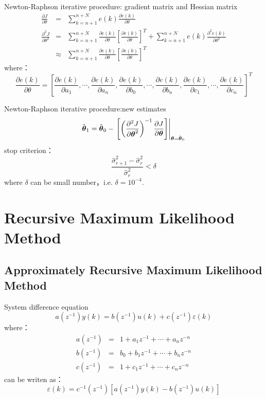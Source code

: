 \bgroup
{}
\begin{frame}{Newton-Raphson iterative procedure: gradient matrix and Hessian matrix }
\begin{eqnarray*}
\frac{\partial J}{\partial\theta} &=& \sum_{k=n+1}^{n+N}e(k)\frac{\partial e(k)}{\partial\theta}  \\
\frac{\partial^2 J}{\partial\theta^2} &=& \sum_{k=n+1}^{n+N}\frac{\partial e(k)}{\partial\theta}\left[\frac{\partial e(k)}{\partial\theta}\right]^T+\sum_{k=n+1}^{n+N}e(k)\frac{\partial^2 e(k)}{\partial\theta^2}  \\
 &\approx& \sum_{k=n+1}^{n+N}\frac{\partial e(k)}{\partial\theta}\left[\frac{\partial e(k)}{\partial\theta}\right]^T
\end{eqnarray*}
where：
$$
\frac{\partial e(k)}{\partial\theta}=\left[\frac{\partial e(k)}{\partial a_1},\cdots,\frac{\partial e(k)}{\partial a_n},\frac{\partial e(k)}{\partial b_0},\cdots,\frac{\partial e(k)}{\partial b_n},\frac{\partial e(k)}{\partial c_1},\cdots,\frac{\partial e(k)}{\partial c_n}\right]^T
$$
\end{frame}
\egroup

\begin{frame}{Newton-Raphson iterative procedure:new estimates}
$$
\hat{\boldsymbol{\theta}}_1 = \hat{\boldsymbol{\theta}}_0 - \left.\left[ \left(\frac{\partial^2 J}{\partial\boldsymbol{\theta}^2}\right)^{-1}\frac{\partial J}{\partial\boldsymbol{\theta}}\right]\right|_{\boldsymbol{\theta}=\hat{\boldsymbol{\theta}}_0}
$$
stop criterion：
$$
\frac{\hat\sigma^2_{r+1}-\hat\sigma^2_r}{\hat\sigma^2_r}< \delta
$$
where $\delta$ can be small number，i.e. $\delta=10^{-4}$.
\end{frame}


\section{Recursive Maximum Likelihood Method }
\subsection{Approximately Recursive Maximum Likelihood Method}
\begin{frame}{ System difference equation }
$$
a(z^{-1})y(k) = b(z^{-1})u(k)+c(z^{-1})\varepsilon(k)
$$
where：
\begin{eqnarray*}
a(z^{-1}) &=&  1+a_1 z^{-1}+\cdots+a_nz^{-n} \\
b(z^{-1}) &=&  b_0+b_1 z^{-1}+\cdots+b_n z^{-n} \\
c(z^{-1}) &=&  1+c_1 z^{-1}+\cdots+c_n z^{-n} 
\end{eqnarray*}
can be writen as：
$$
\varepsilon(k) = c^{-1}(z^{-1})[a(z^{-1})y(k)-b(z^{-1})u(k)]
$$
\end{frame}

